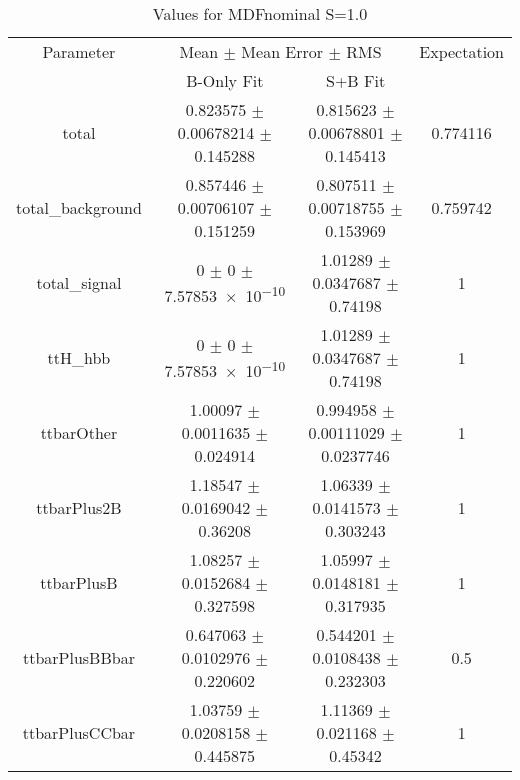 \begin{table}
\centering
\caption{Values for MDFnominal S=1.0}
\begin{tabular}{cccc}
\toprule
Parameter & \multicolumn{2}{c}{Mean $\pm$ Mean Error $\pm$ RMS} & Expectation\\
 & B-Only Fit & S+B Fit & \\
\midrule
total & \num{0.823575} $\pm$ \num{0.00678214} $\pm$ \num{0.145288} & \num{0.815623} $\pm$ \num{0.00678801} $\pm$ \num{0.145413} & \num{0.774116}\\
total\_background & \num{0.857446} $\pm$ \num{0.00706107} $\pm$ \num{0.151259} & \num{0.807511} $\pm$ \num{0.00718755} $\pm$ \num{0.153969} & \num{0.759742}\\
total\_signal & \num{0} $\pm$ \num{0} $\pm$ \num{7.57853e-10} & \num{1.01289} $\pm$ \num{0.0347687} $\pm$ \num{0.74198} & \num{1}\\
ttH\_hbb & \num{0} $\pm$ \num{0} $\pm$ \num{7.57853e-10} & \num{1.01289} $\pm$ \num{0.0347687} $\pm$ \num{0.74198} & \num{1}\\
ttbarOther & \num{1.00097} $\pm$ \num{0.0011635} $\pm$ \num{0.024914} & \num{0.994958} $\pm$ \num{0.00111029} $\pm$ \num{0.0237746} & \num{1}\\
ttbarPlus2B & \num{1.18547} $\pm$ \num{0.0169042} $\pm$ \num{0.36208} & \num{1.06339} $\pm$ \num{0.0141573} $\pm$ \num{0.303243} & \num{1}\\
ttbarPlusB & \num{1.08257} $\pm$ \num{0.0152684} $\pm$ \num{0.327598} & \num{1.05997} $\pm$ \num{0.0148181} $\pm$ \num{0.317935} & \num{1}\\
ttbarPlusBBbar & \num{0.647063} $\pm$ \num{0.0102976} $\pm$ \num{0.220602} & \num{0.544201} $\pm$ \num{0.0108438} $\pm$ \num{0.232303} & \num{0.5}\\
ttbarPlusCCbar & \num{1.03759} $\pm$ \num{0.0208158} $\pm$ \num{0.445875} & \num{1.11369} $\pm$ \num{0.021168} $\pm$ \num{0.45342} & \num{1}\\
\bottomrule
\end{tabular}
\end{table}